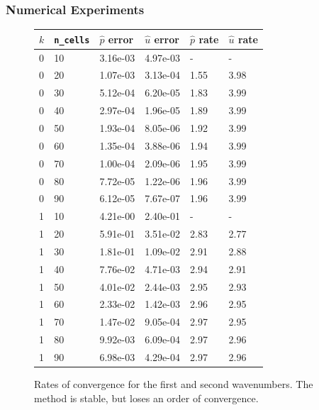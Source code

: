 \documentclass[8pt]{beamer}
\begin{document}
\begin{frame}
    \frametitle{Numerical Experiments}
    \begin{figure}
        \centering
        \begin{tabular}{| l | l | l | l | l | l |}
            \hline
            \(k\) & \texttt{n\_cells} &
            \(\hat{p}\) error & \(\hat{u}\) error &
            \(\hat{p}\) rate & \(\hat{u}\) rate                               \\
            \hline
            0 & 10 & 3.16e-03 & 4.97e-03 & -    & -                           \\
            0 & 20 & 1.07e-03 & 3.13e-04 & 1.55 & 3.98                        \\
            0 & 30 & 5.12e-04 & 6.20e-05 & 1.83 & 3.99                        \\
            0 & 40 & 2.97e-04 & 1.96e-05 & 1.89 & 3.99                        \\
            0 & 50 & 1.93e-04 & 8.05e-06 & 1.92 & 3.99                        \\
            0 & 60 & 1.35e-04 & 3.88e-06 & 1.94 & 3.99                        \\
            0 & 70 & 1.00e-04 & 2.09e-06 & 1.95 & 3.99                        \\
            0 & 80 & 7.72e-05 & 1.22e-06 & 1.96 & 3.99                        \\
            0 & 90 & 6.12e-05 & 7.67e-07 & 1.96 & 3.99                        \\
            \hline
            1 & 10 & 4.21e-00 & 2.40e-01 & -    & -                           \\
            1 & 20 & 5.91e-01 & 3.51e-02 & 2.83 & 2.77                        \\
            1 & 30 & 1.81e-01 & 1.09e-02 & 2.91 & 2.88                        \\
            1 & 40 & 7.76e-02 & 4.71e-03 & 2.94 & 2.91                        \\
            1 & 50 & 4.01e-02 & 2.44e-03 & 2.95 & 2.93                        \\
            1 & 60 & 2.33e-02 & 1.42e-03 & 2.96 & 2.95                        \\
            1 & 70 & 1.47e-02 & 9.05e-04 & 2.97 & 2.95                        \\
            1 & 80 & 9.92e-03 & 6.09e-04 & 2.97 & 2.96                        \\
            1 & 90 & 6.98e-03 & 4.29e-04 & 2.97 & 2.96                        \\
            \hline
        \end{tabular}

        \caption{Rates of convergence for the first and second wavenumbers. The
        method is stable, but loses an order of convergence.}
    \end{figure}
\end{frame}
\end{document}
